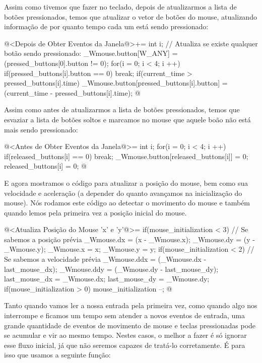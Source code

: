 Assim como tivemos que fazer no teclado, depois de atualizarmos a
lista de botões pressionados, temos que atualizar o vetor de botões do
mouse, atualizando informação de por quanto tempo cada um está sendo
pressionado:

\iniciocodigo
@<Depois de Obter Eventos da Janela@>+=
{
  int i;
  // Atualiza se existe qualquer botão sendo pressionado:
  _Wmouse.button[W_ANY] = (pressed_buttons[0].button != 0);
  for(i = 0; i < 4; i ++){
    if(pressed_buttons[i].button == 0)
      break;
    if(current_time > pressed_buttons[i].time)
      _Wmouse.button[pressed_buttons[i].button] =
        (current_time - pressed_buttons[i].time);
  }
}
@
\fimcodigo

Assim como antes de atualizarmos a lista de botões pressionados, temos
que esvaziar a lista de botões soltos e marcamos no mouse que aquele
boão não está mais sendo pressionado:

\iniciocodigo
@<Antes de Obter Eventos da Janela@>=
{
  int i;
  for(i = 0; i < 4; i ++){
    if(released_buttons[i] == 0)
      break;
    _Wmouse.button[released_buttons[i]] = 0;
    released_buttons[i] = 0;
  }
}
@
\fimcodigo

E agora mostramos o código para atualizar a posição do mouse, bem como
sua velocidade e aceleração (a depender do quanto avançamos na
inicialização do mouse). Nós rodamos este código ao detectar o
movimento do mouse e também quando lemos pela primeira vez a posição
inicial do mouse.

\iniciocodigo
@<Atualiza Posição do Mouse 'x' e 'y'@>=
{
  if(mouse_initialization < 3){ // Se sabemos a posição prévia
    _Wmouse.dx = (x - _Wmouse.x);
    _Wmouse.dy = (y - _Wmouse.y);
  }
  _Wmouse.x = x;
  _Wmouse.y = y;
  if(mouse_initialization < 2){ // Se sabemos a velocidade prévia
    _Wmouse.ddx = (_Wmouse.dx - last_mouse_dx);
    _Wmouse.ddy = (_Wmouse.dy - last_mouse_dy);
  }
  last_mouse_dx = _Wmouse.dx;
  last_mouse_dy = _Wmouse.dy;
  if(mouse_initialization > 0)
    mouse_initialization --;
}
@
\fimcodigo


Tanto quando vamos ler a nossa entrada pela primeira vez, como quando
algo nos interrompe e ficamos um tempo sem atender a novos eventos de
entrada, uma grande quantidade de eventos de movimento de mouse e
teclas pressionadas pode se acumular e vir ao mesmo tempo. Nestes
casos, o melhor a fazer é só ignorar esse fluxo inicial, já que não
seremos capazes de tratá-lo corretamente. É para isso que usamos a
seguinte função:

